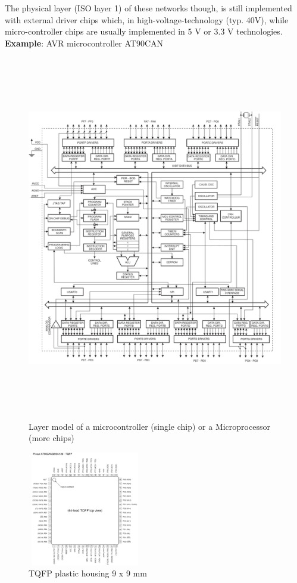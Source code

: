 The physical layer (ISO layer 1) of these networks though, is still implemented with external driver chips which, in high-voltage-technology (typ. 40V), while micro-controller chips are usually implemented in 5 V or 3.3 V technologies.\\

\textbf{Example}: AVR microcontroller AT90CAN

    \begin{figure}[h]
    \centering
    \includegraphics[width=15cm, height=16cm]{Images/image29.png}
    \caption{Layer model of a microcontroller (single chip) or a Microprocessor (more chips)}
    \label{fig:Fig }
    \end{figure}
    
    \begin{figure}[h]
    \centering
    \includegraphics[width=5cm, height=5cm]{Images/image161.png}
    \caption{TQFP plastic housing 9 x 9 mm}
    \label{fig:Fig }
    \end{figure}

